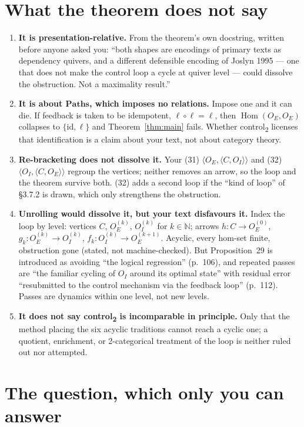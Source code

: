 \documentclass[10pt]{article}
\theoremstyle{remark}
\newcommand{\Hom}{\operatorname{Hom}}
\newcommand{\Paths}{\mathbf{Paths}}
\newcommand{\ctrl}[1]{control\textsubscript{#1}}
\begin{document}
\section{What the theorem does not say}

\begin{enumerate}[leftmargin=1.4em,itemsep=1pt]
\item \textbf{It is presentation-relative.} From the theorem's own docstring, written before anyone asked you: ``both shapes are encodings of primary texts as dependency quivers, and a different defensible encoding of Joslyn 1995 --- one that does not make the control loop a cycle at quiver level --- could dissolve the obstruction. Not a maximality result.''
\item \textbf{It is about $\Paths$, which imposes no relations.} Impose one and it can die. If feedback is taken to be idempotent, $\ell\circ\ell = \ell$, then $\Hom(O_E,O_E)$ collapses to $\{\mathrm{id},\ell\}$ and Theorem~\ref{thm:main} fails. Whether \ctrl{2} licenses that identification is a claim about your text, not about category theory.
\item \textbf{Re-bracketing does not dissolve it.} Your (31) $\langle O_E,\langle C,O_I\rangle\rangle$ and (32) $\langle O_I,\langle C,O_E\rangle\rangle$ regroup the vertices; neither removes an arrow, so the loop and the theorem survive both. (32) adds a second loop if the ``kind of loop'' of \S3.7.2 is drawn, which only strengthens the obstruction.
\item \textbf{Unrolling would dissolve it, but your text disfavours it.} Index the loop by level: vertices $C$, $O_E^{(k)}$, $O_I^{(k)}$ for $k\in\mathbb{N}$; arrows $h\colon C\to O_E^{(0)}$, $g_k\colon O_E^{(k)}\to O_I^{(k)}$, $f_k\colon O_I^{(k)}\to O_E^{(k+1)}$. Acyclic, every hom-set finite, obstruction gone (stated, not machine-checked). But Proposition~29 is introduced as avoiding ``the logical regression'' (p.~106), and repeated passes are ``the familiar cycling of $O_I$ around its optimal state'' with residual error ``resubmitted to the control mechanism via the feedback loop'' (p.~112). Passes are dynamics within one level, not new levels.
\item \textbf{It does not say \ctrl{2} is incomparable in principle.} Only that the method placing the six acyclic traditions cannot reach a cyclic one; a quotient, enrichment, or 2-categorical treatment of the loop is neither ruled out nor attempted.
\end{enumerate}

\section{The question, which only you can answer}
\end{document}
